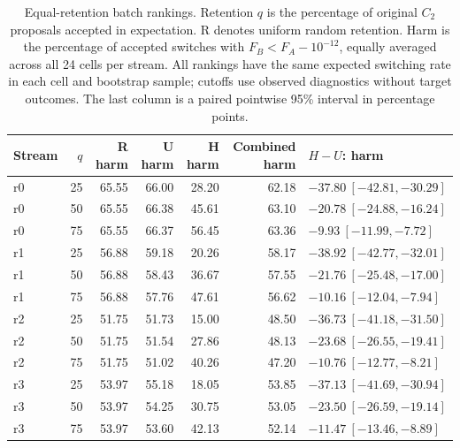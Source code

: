 \begin{table}[ht]
\centering
\scriptsize
\setlength{\tabcolsep}{3pt}
\caption{Equal-retention batch rankings. Retention $q$ is the percentage of original $C_2$ proposals accepted in expectation. R denotes uniform random retention. Harm is the percentage of accepted switches with $F_B<F_A-10^{-12}$, equally averaged across all 24 cells per stream. All rankings have the same expected switching rate in each cell and bootstrap sample; cutoffs use observed diagnostics without target outcomes. The last column is a paired pointwise 95\% interval in percentage points.}
\label{tab:r4-ranking}
\begin{tabular}{@{}lrrrrrl@{}}
\toprule
Stream & $q$ & R harm & U harm & H harm & Combined harm & $H-U$: harm \\
\midrule
r0 & 25 & 65.55 & 66.00 & 28.20 & 62.18 & $-37.80\ [-42.81,-30.29]$ \\
r0 & 50 & 65.55 & 66.38 & 45.61 & 63.10 & $-20.78\ [-24.88,-16.24]$ \\
r0 & 75 & 65.55 & 66.37 & 56.45 & 63.36 & $-9.93\ [-11.99,-7.72]$ \\
r1 & 25 & 56.88 & 59.18 & 20.26 & 58.17 & $-38.92\ [-42.77,-32.01]$ \\
r1 & 50 & 56.88 & 58.43 & 36.67 & 57.55 & $-21.76\ [-25.48,-17.00]$ \\
r1 & 75 & 56.88 & 57.76 & 47.61 & 56.62 & $-10.16\ [-12.04,-7.94]$ \\
r2 & 25 & 51.75 & 51.73 & 15.00 & 48.50 & $-36.73\ [-41.18,-31.50]$ \\
r2 & 50 & 51.75 & 51.54 & 27.86 & 48.13 & $-23.68\ [-26.55,-19.41]$ \\
r2 & 75 & 51.75 & 51.02 & 40.26 & 47.20 & $-10.76\ [-12.77,-8.21]$ \\
r3 & 25 & 53.97 & 55.18 & 18.05 & 53.85 & $-37.13\ [-41.69,-30.94]$ \\
r3 & 50 & 53.97 & 54.25 & 30.75 & 53.05 & $-23.50\ [-26.59,-19.14]$ \\
r3 & 75 & 53.97 & 53.60 & 42.13 & 52.14 & $-11.47\ [-13.46,-8.89]$ \\
\bottomrule
\end{tabular}
\end{table}

